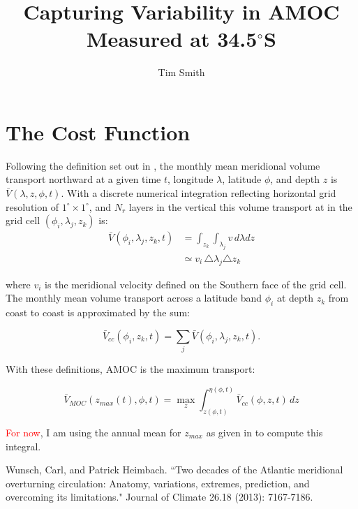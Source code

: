\documentclass[a4paper,11pt]{article}
\title{\vspace{-5ex}Capturing Variability in AMOC \\ Measured at 34.5$^\circ$S}
\author{Tim Smith}
\date{\vspace{-3ex}}
\newcommand{\red}[1]{\textcolor{red}{#1}}
\begin{document}
\maketitle

\begin{abstract}
  
\end{abstract}

\section{The Cost Function}

  Following the definition set out in \cite{wunschAndHeimbach_AMOC}, the monthly mean meridional volume transport northward at a given time $t$, longitude $\lambda$, latitude $\phi$, and depth $z$ is $\bar{V}(\lambda,z,\phi,t)$. With a discrete numerical integration reflecting horizontal grid resolution of $1^{\circ} \times 1^{\circ}$, and $N_r$ layers in the vertical this volume transport at in the grid cell $(\phi_i,\lambda_j,z_k)$ is: 
  \begin{align}
    \bar{V}(\phi_i,\lambda_j,z_k,t) &= \int_{z_k}\int_{\lambda_j}v \,d\lambda dz \\
				    &\simeq v_i \,  \triangle \lambda_j \triangle z_k
    \label{eq:volTrans}
  \end{align}
  
  where $v_i$ is the meridional velocity defined on the Southern face of the grid cell. The monthly mean volume transport across a latitude band $\phi_i$ at depth $z_k$ from coast to coast is approximated by the sum: 
  
  \begin{equation}
    \bar{V}_{cc}(\phi_i,z_k,t) = \sum_{j}\bar{V}(\phi_i,\lambda_j,z_k,t) .
    \label{eq:vcc}
  \end{equation}

  With these definitions, AMOC is the maximum transport: 
  
  \begin{equation}
    \bar{V}_{MOC}(z_{max}(t),\phi,t) = \max_z\int_{z(\phi,t)}^{\eta(\phi,t)}\bar{V}_{cc}(\phi,z,t) \, dz
    \label{eq:amoc}
  \end{equation}

  \red{For now}, I am using the annual mean for $z_{max}$ as given in \cite{wunschAndHeimbach_AMOC} to compute this integral.   

  
\begin{thebibliography}{3}

  Wunsch, Carl, and Patrick Heimbach. ``Two decades of the Atlantic meridional overturning circulation: Anatomy, variations, extremes, prediction, and overcoming its limitations." Journal of Climate 26.18 (2013): 7167-7186.

\end{thebibliography}
\end{document}
